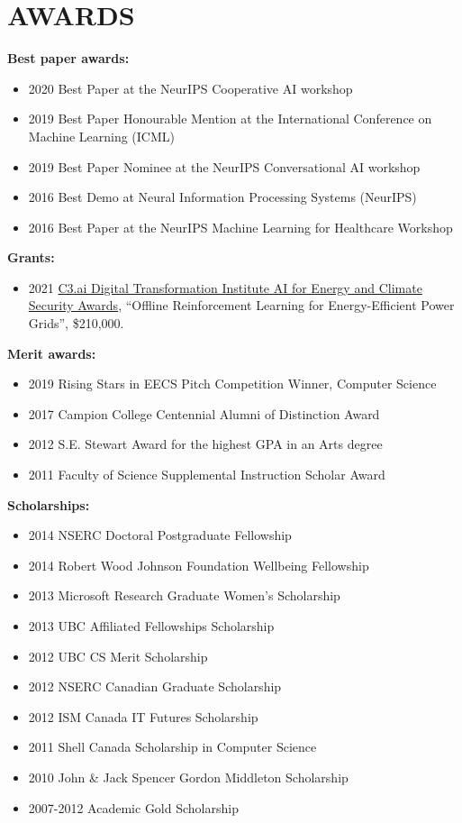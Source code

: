 \documentclass[paper=letter,fontsize=11pt]{scrartcl} %
\newcommand{\NewPart}[2]{\section*{\uppercase{#1} #2}}
\begin{document}
\NewPart{Awards}{}
\textbf{Best paper awards:}
\begin{itemize}
\item 2020 Best Paper at the NeurIPS Cooperative AI workshop
\item 2019 Best Paper Honourable Mention at the International Conference on Machine Learning (ICML)
\item 2019 Best Paper Nominee at the NeurIPS Conversational AI workshop
\item 2016 Best Demo at Neural Information Processing Systems (NeurIPS)
\item 2016 Best Paper at the NeurIPS Machine Learning for Healthcare Workshop
\end{itemize}

\noindent \textbf{Grants:}
\begin{itemize}
\item 2021 \href{https://c3dti.ai/c3-announces-energy-climate-awards/}{C3.ai Digital Transformation Institute AI for Energy and Climate Security Awards}, “Offline Reinforcement Learning for Energy-Efficient Power Grids”, \$210,000. %
\end{itemize}

\noindent \textbf{Merit awards:}
\begin{itemize}
\item 2019 Rising Stars in EECS Pitch Competition Winner, Computer Science
\item 2017 Campion College Centennial Alumni of Distinction Award
\item 2012 S.E. Stewart Award for the highest GPA in an Arts degree
\item 2011 Faculty of Science Supplemental Instruction Scholar Award
\end{itemize}

\noindent \textbf{Scholarships:}
\begin{itemize}
\item 2014 NSERC Doctoral Postgraduate Fellowship
\item 2014 Robert Wood Johnson Foundation Wellbeing Fellowship
\item 2013 Microsoft Research Graduate Women's Scholarship
\item 2013 UBC Affiliated Fellowships Scholarship
\item 2012 UBC CS Merit Scholarship
\item 2012 NSERC Canadian Graduate Scholarship
\item 2012 ISM Canada IT Futures Scholarship
\item 2011 Shell Canada Scholarship in Computer Science
\item 2010 John \& Jack Spencer Gordon Middleton Scholarship
\item 2007-2012 Academic Gold Scholarship
\end{itemize}
\end{document}
